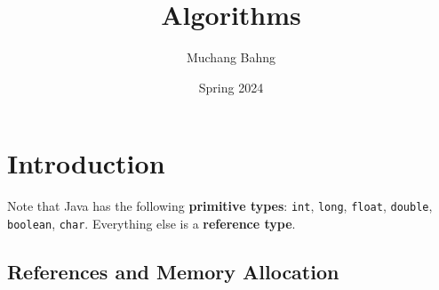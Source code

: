 \documentclass{article}
\begin{document}
\title{Algorithms}
\author{Muchang Bahng}
\date{Spring 2024}

\maketitle
\tableofcontents
\pagebreak

\section{Introduction}

  Note that Java has the following \textbf{primitive types}: \texttt{int}, \texttt{long}, \texttt{float}, \texttt{double}, \texttt{boolean}, \texttt{char}. Everything else is a \textbf{reference type}. 

  \subsection{References and Memory Allocation}
\end{document}
